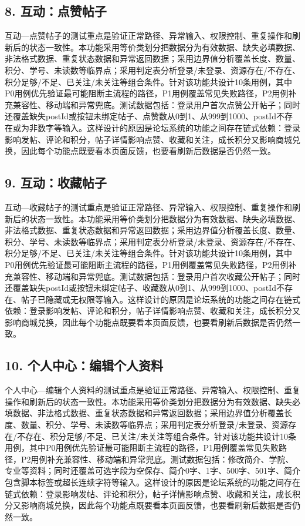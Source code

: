 \documentclass[UTF8,zihao=-4]{ctexart}
\begin{document}
\subsection{8. 互动：点赞帖子}
互动—点赞帖子的测试重点是验证正常路径、异常输入、权限控制、重复操作和刷新后的状态一致性。本功能采用等价类划分把数据分为有效数据、缺失必填数据、非法格式数据、重复状态数据和异常返回数据；采用边界值分析覆盖长度、数量、积分、学号、未读数等临界点；采用判定表分析登录/未登录、资源存在/不存在、积分足够/不足、已关注/未关注等组合条件。针对该功能共设计10条用例，其中P0用例优先验证最可能阻断主流程的路径，P1用例覆盖常见失败路径，P2用例补充兼容性、移动端和异常兜底。测试数据包括：登录用户首次点赞公开帖子；同时还覆盖缺失postId或按钮未绑定帖子、点赞数从0到1、从999到1000、postId不存在或为非数字等输入。这样设计的原因是论坛系统的功能之间存在链式依赖：登录影响发帖、评论和积分，帖子详情影响点赞、收藏和关注，成长积分又影响商城兑换，因此每个功能点既要看本页面反馈，也要看刷新后数据是否仍然一致。

\subsection{9. 互动：收藏帖子}
互动—收藏帖子的测试重点是验证正常路径、异常输入、权限控制、重复操作和刷新后的状态一致性。本功能采用等价类划分把数据分为有效数据、缺失必填数据、非法格式数据、重复状态数据和异常返回数据；采用边界值分析覆盖长度、数量、积分、学号、未读数等临界点；采用判定表分析登录/未登录、资源存在/不存在、积分足够/不足、已关注/未关注等组合条件。针对该功能共设计10条用例，其中P0用例优先验证最可能阻断主流程的路径，P1用例覆盖常见失败路径，P2用例补充兼容性、移动端和异常兜底。测试数据包括：登录用户首次收藏公开帖子；同时还覆盖缺失postId或按钮未绑定帖子、收藏数从0到1、从999到1000、postId不存在、帖子已隐藏或无权限等输入。这样设计的原因是论坛系统的功能之间存在链式依赖：登录影响发帖、评论和积分，帖子详情影响点赞、收藏和关注，成长积分又影响商城兑换，因此每个功能点既要看本页面反馈，也要看刷新后数据是否仍然一致。

\subsection{10. 个人中心：编辑个人资料}
个人中心—编辑个人资料的测试重点是验证正常路径、异常输入、权限控制、重复操作和刷新后的状态一致性。本功能采用等价类划分把数据分为有效数据、缺失必填数据、非法格式数据、重复状态数据和异常返回数据；采用边界值分析覆盖长度、数量、积分、学号、未读数等临界点；采用判定表分析登录/未登录、资源存在/不存在、积分足够/不足、已关注/未关注等组合条件。针对该功能共设计10条用例，其中P0用例优先验证最可能阻断主流程的路径，P1用例覆盖常见失败路径，P2用例补充兼容性、移动端和异常兜底。测试数据包括：修改简介、学院、专业等资料；同时还覆盖可选字段为空保存、简介0字、1字、500字、501字、简介包含脚本标签或超长连续字符等输入。这样设计的原因是论坛系统的功能之间存在链式依赖：登录影响发帖、评论和积分，帖子详情影响点赞、收藏和关注，成长积分又影响商城兑换，因此每个功能点既要看本页面反馈，也要看刷新后数据是否仍然一致。
\end{document}
